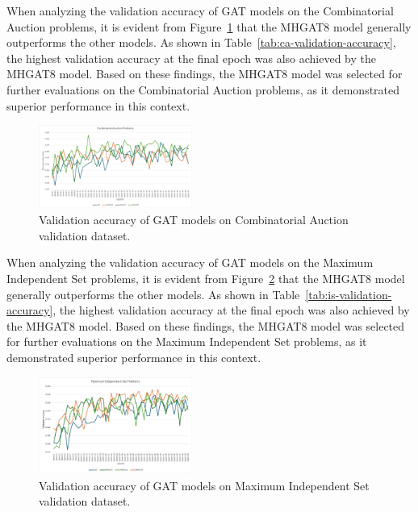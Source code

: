 When analyzing the validation accuracy of GAT models on the Combinatorial Auction problems, it is evident from Figure~\ref{fig:ca-validation-accuracy} that the MHGAT8 model generally outperforms the other models.
As shown in Table~\ref{tab:ca-validation-accuracy}, the highest validation accuracy at the final epoch was also achieved by the MHGAT8 model.
Based on these findings, the MHGAT8 model was selected for further evaluations on the Combinatorial Auction problems, as it demonstrated superior performance in this context.




\begin{figure}[htb!]
    \centering
    \includegraphics[width=0.45\textwidth]{figures/CA Validation Accuracy}
    \caption{Validation accuracy of GAT models on Combinatorial Auction validation dataset.}
    \label{fig:ca-validation-accuracy}
\end{figure}


When analyzing the validation accuracy of GAT models on the Maximum Independent Set problems, it is evident from Figure~\ref{fig:is-validation-accuracy} that the MHGAT8 model generally outperforms the other models.
As shown in Table~\ref{tab:is-validation-accuracy}, the highest validation accuracy at the final epoch was also achieved by the MHGAT8 model.
Based on these findings, the MHGAT8 model was selected for further evaluations on the Maximum Independent Set problems, as it demonstrated superior performance in this context.



\begin{figure}[htb!]
    \centering
    \includegraphics[width=0.45\textwidth]{figures/IS Validation Accuracy}
    \caption{Validation accuracy of GAT models on Maximum Independent Set validation dataset.}
    \label{fig:is-validation-accuracy}
\end{figure}


